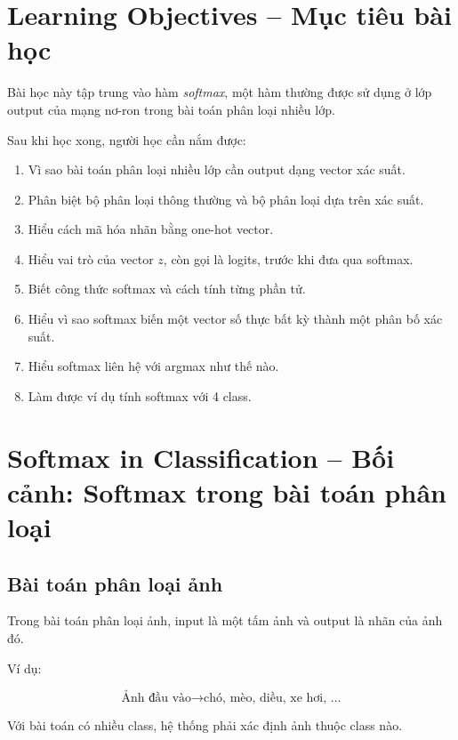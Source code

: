 

\section*{Learning Objectives -- Mục tiêu bài học}

Bài học này tập trung vào hàm \textit{softmax}, một hàm thường được sử dụng ở lớp output của mạng nơ-ron trong bài toán phân loại nhiều lớp.

Sau khi học xong, người học cần nắm được:

\begin{enumerate}[label=\arabic*.]
    \item Vì sao bài toán phân loại nhiều lớp cần output dạng vector xác suất.
    \item Phân biệt bộ phân loại thông thường và bộ phân loại dựa trên xác suất.
    \item Hiểu cách mã hóa nhãn bằng one-hot vector.
    \item Hiểu vai trò của vector $z$, còn gọi là logits, trước khi đưa qua softmax.
    \item Biết công thức softmax và cách tính từng phần tử.
    \item Hiểu vì sao softmax biến một vector số thực bất kỳ thành một phân bố xác suất.
    \item Hiểu softmax liên hệ với argmax như thế nào.
    \item Làm được ví dụ tính softmax với 4 class.
\end{enumerate}

\section{Softmax in Classification -- Bối cảnh: Softmax trong bài toán phân loại}

\subsection{Bài toán phân loại ảnh}

Trong bài toán phân loại ảnh, input là một tấm ảnh và output là nhãn của ảnh đó.

Ví dụ:

\[
    \text{Ảnh đầu vào}
    \longrightarrow
    \text{chó, mèo, diều, xe hơi, ...}
\]

Với bài toán có nhiều class, hệ thống phải xác định ảnh thuộc class nào.

